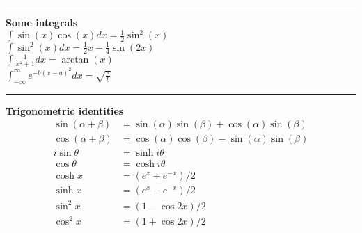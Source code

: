 \documentclass[10pt]{article} %
\begin{document}
\begin{multicols}{4}
{\begin{flushleft}
            \vspace{0.1cm}
            \hrule
            \vspace{0.1cm}
            \textbf{Some integrals}\\
            \(
            \int \sin(x)\cos(x)dx = \frac{1}{2}\sin^2(x)
            \)\\
            \(
            \int \sin^2(x)dx = \frac{1}{2}x - \frac{1}{4}\sin(2x)
            \)\\
            \(
            \int \frac{1}{x^2+1} dx = \arctan(x)
            \)\\
            \(
            \int_{-\infty}^{\infty} e^{-b(x-a)^2}dx = \sqrt{\frac{\pi}{b}}
            \)\\
            \vspace{0.1cm}
            \hrule
            \vspace{0.1cm}

            \textbf{Trigonometric identities}
            \begin{align*}
                \sin(\alpha +\beta) & = \sin(\alpha)\sin(\beta) + \cos(\alpha)\sin(\beta) \\
                \cos(\alpha+\beta)  & = \cos(\alpha)\cos(\beta) - \sin(\alpha)\sin(\beta) \\
                i \sin \theta       & = \sinh {i\theta}                                   \\
                \cos \theta         & = \cosh {i\theta}                                   \\
                \cosh x             & = (e^x+e^{-x})/2                                    \\
                \sinh x             & = (e^x-e^{-x})/2                                    \\
                \sin^2 x            & = (1-\cos{2x})/2                                    \\
                \cos^2 x            & = (1+\cos{2x})/2
            \end{align*}

        \end{flushleft}
    }
\end{multicols}
\end{document}
